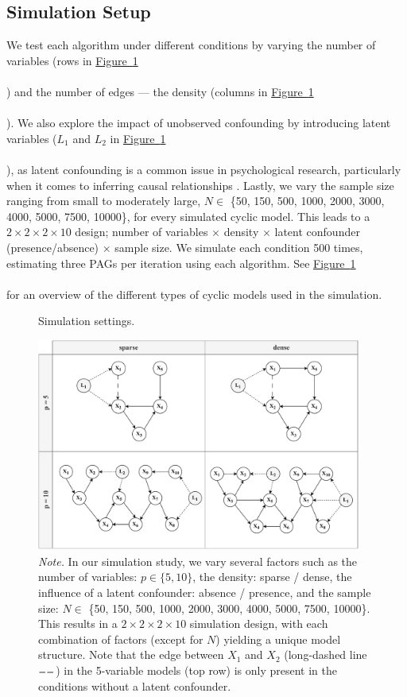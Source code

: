 \documentclass[twoside, 11pt]{article}
\newcommand{\thickdash}{%
\begin{tikzpicture}
[baseline=-0.7mm]
\draw [line width= 0.6pt, dash pattern={on 6pt off 2pt}] (0,0) -- (0.5,0);
\end{tikzpicture}
}
\newcommand*{\figref}[2][]{%
  \hyperref[{fig:#2}]{%
    Figure~\ref*{fig:#2}%
    \ifx\\#1\\%
    \else
      #1%
    \fi
  }%
}
\begin{document}
\subsection{Simulation Setup}
We test each algorithm under different conditions by varying the number of variables (rows in \figref{11}) and the number of edges --- the density (columns in \figref{11}). We also explore the impact of unobserved confounding by introducing latent variables ($L_1$ and $L_2$ in \figref{11}), as latent confounding is a common issue in psychological research, particularly when it comes to inferring causal relationships \citep{hallquist2019, rohr2022}. Lastly, we vary the sample size ranging from small to moderately large, $N \in$ \{50, 150, 500, 1000, 2000, 3000, 4000, 5000, 7500, 10000\}, for every simulated cyclic model. This leads to a $2 \times 2 \times 2 \times 10$ design; number of variables $\times$ density $\times$ latent confounder (presence/absence) $\times$ sample size. We simulate each condition 500 times, estimating three PAGs per iteration using each algorithm. See \figref[]{11} for an overview of the different types of cyclic models used in the simulation.

\vspace{3mm}

\begin{figure}[!hb]
    \centering
        \caption{Simulation settings.}
        \includegraphics[width=0.95\textwidth]{figures/Fig11.pdf}
        \vspace*{1mm}
        \caption*{\small{\textit{Note.} In our simulation study, we vary several factors such as the number of variables: $p \in \{5, 10\}$, the density: sparse / dense, the influence of a latent confounder: absence / presence, and the sample size: $N \in$ \{50, 150, 500, 1000, 2000, 3000, 4000, 5000, 7500, 10000\}. This results in a $2 \times 2 \times 2 \times 10$ simulation design, with each combination of factors (except for $N$) yielding a unique model structure. Note that the edge between $X_1$ and $X_2$ (long-dashed line $\thickdash$) in the 5-variable models (top row) is only present in the conditions without a latent confounder.}}
    \label{fig:11}
\end{figure}
 
\end{document}
